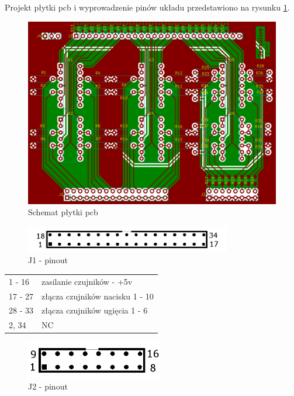 \documentclass{article}
\begin{document}
Projekt płytki pcb i wyprowadzenie pinów układu przedstawiono na rysunku  \ref{rys:pcb}.

\begin{figure}[H]
	\centering
	\includegraphics[width=12cm]{pcb.png}
	\caption{Schemat płytki pcb}
	\label{rys:pcb}
\end{figure}

\begin{figure}[H]
	\centering
	\includegraphics[width=9cm]{J1.png}
	\caption{J1 - pinout}
	\label{rys:J1 - pinout}
\end{figure}

\begin{table}[H]
	\centering
	\label{J1 - pinout}
	\begin{tabular}{ll}
	1 - 16		&	zasilanie czujników - +5v		\\
	17 - 27		&	złącza czujników nacisku 1 - 10		\\
	28 - 33		&	złącza czujników ugięcia 1 - 6		\\
	2, 34		&	NC					\\
\end{tabular}
\end{table}

\begin{figure}[H]
	\centering
	\includegraphics[width=6cm]{J2.png}
	\caption{J2 - pinout}
	\label{rys:J2 - pinout}
\end{figure}
\end{document}
